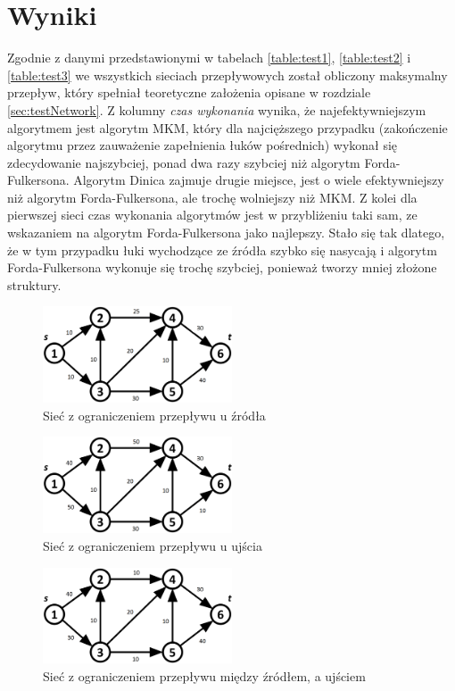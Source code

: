 \section{Wyniki}
Zgodnie z danymi przedstawionymi w tabelach \ref{table:test1}, \ref{table:test2} i \ref{table:test3} we wszystkich sieciach przepływowych został obliczony maksymalny przepływ, który spełniał teoretyczne założenia opisane w rozdziale \ref{sec:testNetwork}. Z kolumny \textit{czas wykonania} wynika, że najefektywniejszym algorytmem jest algorytm MKM, który dla najcięższego przypadku (zakończenie algorytmu przez zauważenie zapełnienia łuków pośrednich) wykonał się zdecydowanie najszybciej, ponad dwa razy szybciej niż algorytm Forda-Fulkersona. Algorytm Dinica zajmuje drugie miejsce, jest o wiele efektywniejszy niż algorytm Forda-Fulkersona, ale trochę wolniejszy niż MKM. Z kolei dla pierwszej sieci czas wykonania algorytmów jest w przybliżeniu taki sam, ze wskazaniem na algorytm Forda-Fulkersona jako najlepszy. Stało się tak dlatego, że w tym przypadku łuki wychodzące ze źródła szybko się nasycają i algorytm Forda-Fulkersona wykonuje się trochę szybciej, ponieważ tworzy mniej złożone struktury.
\begin{figure}
	\centering
	\includegraphics[width=0.5\textwidth]{./img/test1}
	\caption{Sieć z ograniczeniem przepływu u źródła}
	\label{fig:test1}
\end{figure}
\begin{figure}
	\centering
	\includegraphics[width=0.5\textwidth]{./img/test2}
	\caption{Sieć z ograniczeniem przepływu u ujścia}
	\label{fig:test2}
\end{figure}
\begin{figure}
	\centering
	\includegraphics[width=0.5\textwidth]{./img/test3}
	\caption{Sieć z ograniczeniem przepływu między źródłem, a ujściem}
	\label{fig:test3}
\end{figure}
